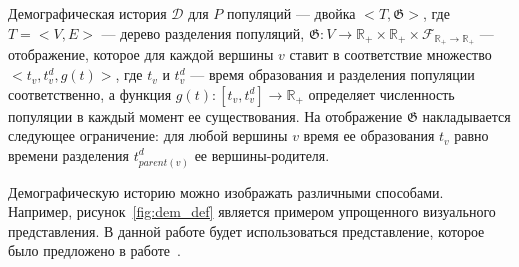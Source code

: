 \documentclass[a4paper,14pt,oneside,openany,article]{memoir}
\begin{document}

 Демографическая история $\mathcal{D}$ для $P$ популяций --- двойка $<T, \mathfrak{G}>$, где $T = <V, E>$ --- дерево разделения популяций, $\mathfrak{G}: V \to \mathbb{R}_+ \times \mathbb{R}_+ \times \mathcal{F}_{\mathbb{R}_+ \to \mathbb{R}_+}$ --- отображение, которое для каждой вершины $v$ ставит в соответствие множество $<t_v, t^d_v, g(t)>$, где $t_v$ и $t^d_v$ --- время образования и разделения популяции соответственно, а функция $g(t): [t_v, t^d_v] \to \mathbb{R}_+$ определяет численность популяции в каждый момент ее существования.
На отображение $\mathfrak{G}$ накладывается следующее ограничение: для любой вершины $v$ время ее образования 
 $t_v$ равно времени разделения $t^d_{parent(v)}$ ее вершины-родителя.

Демографическую историю можно изображать различными способами.
Например, рисунок~\ref{fig:dem_def} является примером упрощенного визуального представления.
В данной работе будет использоваться представление, которое было предложено в работе~.
\end{document}

